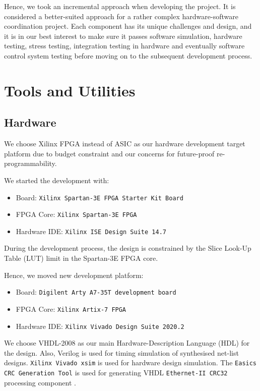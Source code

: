 \documentclass[a4paper]{report}
\newcommand{\proglang}{\textsf}
\newcommand{\code}{\texttt}
\begin{document}
Hence, we took an incremental approach when developing the project. It is considered a better-suited approach for a rather complex hardware-software coordination project. Each component has its unique challenges and design, and it is in our best interest to make sure it passes software simulation, hardware testing, stress testing, integration testing in hardware and eventually software control system testing before moving on to the subsequent development process.

\section{Tools and Utilities}

\subsection{Hardware}
\label{section:introduction-tools-hardware}

We choose Xilinx FPGA instead of ASIC as our hardware development target platform due to budget constraint and our concerns for future-proof re-programmability.

We started the development with:
\begin{itemize}
    \item Board: \code{Xilinx Spartan-3E FPGA Starter Kit Board} \cite{xilinx-documentation-2011}
    \item FPGA Core: \code{Xilinx Spartan-3E FPGA} \cite{xilinx-documentation-2011-core}
    \item Hardware IDE: \code{Xilinx ISE Design Suite 14.7} \cite{xilinx-documentation-ise}
\end{itemize}

During the development process, the design is constrained by the Slice Look-Up Table (LUT) limit in the Spartan-3E FPGA core. 

Hence, we moved new development platform:
\begin{itemize}
    \item Board: \code{Digilent Arty A7-35T development board} \cite{digilent-arty}
    \item FPGA Core: \code{Xilinx Artix-7 FPGA} \cite{xilinx-documentation-artix}
    \item Hardware IDE: \code{Xilinx Vivado Design Suite 2020.2} \cite{xilinx-documentation-vivado}
\end{itemize}

We choose \proglang{VHDL-2008} \cite{ieee-vhdl} as our main Hardware-Description Language (HDL) for the design. Also, \proglang{Verilog} \cite{ieee-verilog} is used for timing simulation of synthesised net-list designs. \code{Xilinx Vivado xsim} \cite{xilinx-documentation-vivado} is used for hardware design simulation. The \code{Easics CRC Generation Tool} is used for generating \proglang{VHDL} \code{Ethernet-II CRC32} processing component \cite{easics-crc}.
\end{document}
